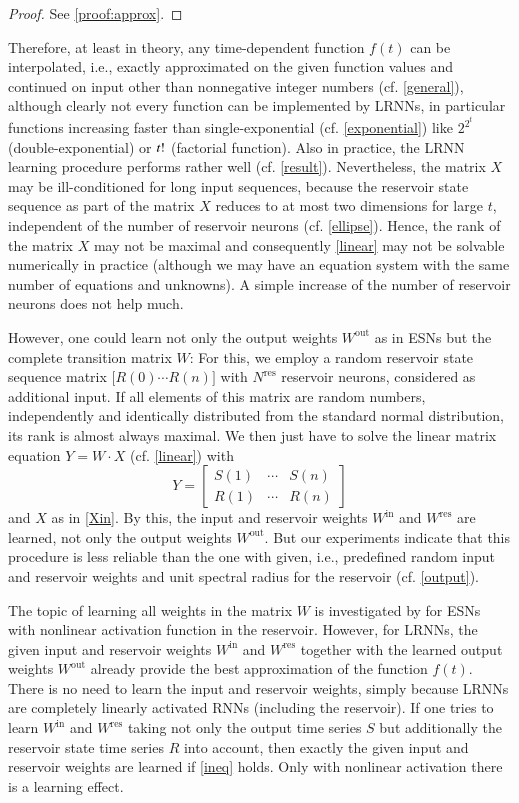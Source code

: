 \documentclass[preprint,12pt,times,authoryear]{elsarticle}%
\theoremstyle{definition}
\begin{document}
\begin{proof}
See \ref{proof:approx}.
\end{proof}

Therefore, at least in theory, any time-dependent function $f(t)$ can be
interpolated, i.e., exactly approximated on the given function values and
continued on input other than nonnegative integer numbers (cf. \cref{general}),
although clearly not every function can be implemented by LRNNs, in particular
functions increasing faster than single-exponential (cf. \cref{exponential})
like $2^{2^t}$ (double-exponential) or $t\/!$ (factorial function). Also in
practice, the LRNN learning procedure performs rather well (cf. \cref{result}).
Nevertheless, the matrix $X$ may be ill-conditioned for long input sequences, because the reservoir state
sequence as part of the matrix $X$ reduces to at most two dimensions for large
$t$, independent of the number of reservoir neurons (cf. \cref{ellipse}). Hence,
the rank of the matrix $X$ may not be maximal and consequently \cref{linear} may not
be solvable numerically in practice (although we may have an equation system with
the same number of equations and unknowns). A simple increase of the number of
reservoir neurons does not help much.

However, one could learn not only the output weights $W^\mathrm{out}$ as in ESNs
but the complete transition matrix $W$: For this, we employ a random reservoir
state sequence matrix $\big[R(0) \cdots R(n) \big]$ with $N^\mathrm{res}$
reservoir neurons, considered as additional input. If all elements of this
matrix are random numbers, independently and identically distributed from the
standard normal distribution, its rank is almost always maximal. We then just
have to solve the linear matrix equation $Y = W \cdot X$ (cf. \cref{linear})
with
\[ Y = \left[ \begin{array}{ccc}
	S(1) & \cdots & S(n)\\
	R(1) & \cdots & R(n)
\end{array} \right] \]
and $X$ as in \cref{Xin}. By this, the input and reservoir weights
$W^\mathrm{in}$ and $W^\mathrm{res}$ are learned, not only the output weights
$W^\mathrm{out}$. But our experiments indicate that this procedure is less
reliable than the one with given, i.e., predefined random input and reservoir
weights and unit spectral radius for the reservoir (cf. \cref{output}).

The topic of learning all weights in the matrix $W$ is investigated
by \citet{PDW13} for ESNs with nonlinear activation function in the reservoir.
However, for LRNNs, the given input and reservoir weights $W^\mathrm{in}$ and
$W^\mathrm{res}$ together with the learned output weights $W^\mathrm{out}$
already provide the best approximation of the function $f(t)$. There is no need
to learn the input and reservoir weights, simply because LRNNs are completely
linearly activated RNNs (including the reservoir). If one tries to learn
$W^\mathrm{in}$ and $W^\mathrm{res}$ taking not only the output time series $S$
but additionally the reservoir state time series $R$ into account, then exactly
the given input and reservoir weights are learned if \cref{ineq} holds. Only
with nonlinear activation there is a learning effect.
\end{document}
